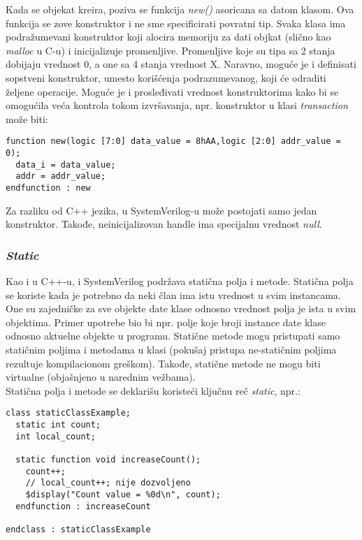 Kada se objekat kreira, poziva se funkcija \emph{new()} asoricana sa datom
klasom. Ova funkcija se zove konstruktor i ne sme specificirati povratni tip.
Svaka klasa ima podražumevani konstruktor koji alocira memoriju za dati objkat
(slično kao \emph{malloc} u C-u) i inicijalizuje promenljive. Promenljive koje
su tipa sa 2 stanja dobijaju vrednost 0, a one sa 4 stanja vrednost X. Naravno,
moguće je i definisati sopstveni konstruktor, umesto korišćenja podrazumevanog,
koji će odraditi željene operacije. Moguće je i prosleđivati vrednost
konstruktorima kako bi se omogućila veća kontrola tokom izvršavanja, npr.
konstruktor u klasi \emph{transaction} može biti:

\begin{lstlisting}
function new(logic [7:0] data_value = 8hAA,logic [2:0] addr_value = 0);
  data_i = data_value;
  addr = addr_value;
endfunction : new
\end{lstlisting}

Za razliku od C++ jezika, u SystemVerilog-u može postojati samo jedan
konstruktor. Takođe, neinicijalizovan handle ima specijalnu vrednost
\emph{null}.


\subsubsection{\emph{Static}}

Kao i u C++-u, i SystemVerilog podržava statična polja i metode. Statična polja
se koriste kada je potrebno da neki član ima istu vrednost u svim instancama.
One su zajedničke za sve objekte date klase odnosno vrednost polja je ista u
svim objektima. Primer upotrebe bio bi npr. polje koje broji instance date klase
odnosno aktuelne objekte u programu. Statične metode mogu pristupati samo
statičnim poljima i metodama u klasi (pokušaj pristupa ne-statičnim poljima
rezultuje kompilacionom greškom). Takođe, statične metode ne mogu biti
virtualne (objašnjeno u narednim vežbama).\\

Statična polja i metode se deklarišu koristeći ključnu reč \emph{static}, npr.:

\begin{lstlisting}
class staticClassExample;
  static int count;
  int local_count;

  static function void increaseCount();
    count++;
    // local_count++; nije dozvoljeno
    $display("Count value = %0d\n", count);
  endfunction : increaseCount
    
endclass : staticClassExample
\end{lstlisting}

